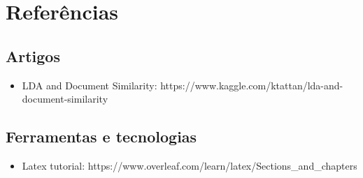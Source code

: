 \section{Referências}

\subsection{Artigos}

\begin{itemize}
    \item LDA and Document Similarity: https://www.kaggle.com/ktattan/lda-and-document-similarity
\end{itemize}

\subsection{Ferramentas e tecnologias}

\begin{itemize}
    \item Latex tutorial: https://www.overleaf.com/learn/latex/Sections\_and\_chapters
\end{itemize}